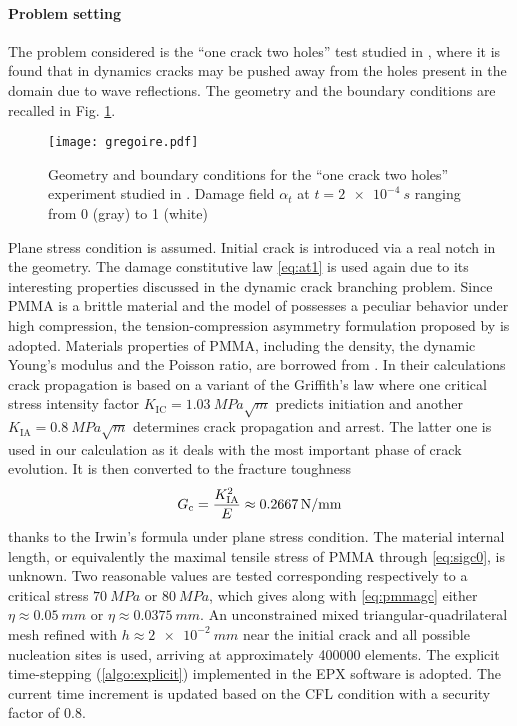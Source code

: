 \paragraph{Problem setting} The problem considered is the ``one crack two holes'' test studied in \cite{HaboussaGregoireElguedjMaigreCombescure:2011}, where it is found that in dynamics cracks may be pushed away from the holes present in the domain due to wave reflections. The geometry and the boundary conditions are recalled in Fig. \ref{fig:gregoire}.
\begin{figure}[htbp]
\centering
\texttt{[image: gregoire.pdf]}
\caption{Geometry and boundary conditions for the ``one crack two holes'' experiment studied in \cite{HaboussaGregoireElguedjMaigreCombescure:2011}. Damage field $\alpha_t$ at $t=\SI{2e-4}{s}$ ranging from 0 (gray) to 1 (white)} \label{fig:gregoire}
\end{figure}
Plane stress condition is assumed. Initial crack is introduced via a real notch in the geometry. The damage constitutive law \eqref{eq:at1} is used again due to its interesting properties discussed in the dynamic crack branching problem. Since PMMA is a brittle material \cite{GregoireMaigreRethoreCombescure:2007} and the model of \cite{MieheHofackerWelschinger:2010} possesses a peculiar behavior under high compression, the tension-compression asymmetry formulation proposed by \cite{FreddiRoyer-Carfagni:2010} is adopted. Materials properties of PMMA, including the density, the dynamic Young's modulus and the Poisson ratio, are borrowed from \cite{HaboussaGregoireElguedjMaigreCombescure:2011}. In their calculations crack propagation is based on a variant of the Griffith's law where one critical stress intensity factor $K_\mathrm{IC}=\SI{1.03}{MPa\sqrt{m}}$ predicts initiation and another $K_\mathrm{IA}=\SI{0.8}{MPa\sqrt{m}}$ determines crack propagation and arrest. The latter one is used in our calculation as it deals with the most important phase of crack evolution. It is then converted to the fracture toughness
\begin{equation} \label{eq:pmmagc}
G_\mathrm{c}=\frac{K_\mathrm{IA}^2}{E}\approx\SI{0.2667}{N/mm}
\end{equation}
thanks to the Irwin's formula under plane stress condition. The material internal length, or equivalently the maximal tensile stress of PMMA through \eqref{eq:sigc0}, is unknown. Two reasonable values are tested corresponding respectively to a critical stress $\SI{70}{MPa}$ or $\SI{80}{MPa}$, which gives along with \eqref{eq:pmmagc} either $\eta\approx\SI{0.05}{mm}$ or $\eta\approx\SI{0.0375}{mm}$. An unconstrained mixed triangular-quadrilateral mesh refined with $h\approx\SI{2e-2}{mm}$ near the initial crack and all possible nucleation sites is used, arriving at approximately \num{400000} elements. The explicit time-stepping (\cref{algo:explicit}) implemented in the EPX software is adopted. The current time increment is updated based on the CFL condition with a security factor of 0.8.

